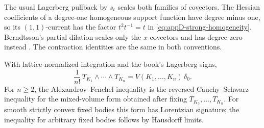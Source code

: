 \begin{remark}
\label{rem:appD-dilation-convention}
The usual Lagerberg pullback by \(s_t\) scales both families of
covectors.  The Hessian coefficients of a degree-one homogeneous
support function have degree minus one, so its \((1,1)\)-current has
the factor \(t^2t^{-1}=t\) in
\eqref{eq:appD-strong-homogeneity}.  Berndtsson's partial dilation
scales only the \(x\)-covectors and has degree zero instead
\cite[Section~7]{Ber26Convex}.  The contraction identities are the
same in both conventions.
\end{remark}

\begin{theorem}\label{thm:appD-support-current-mixed-volume}
With lattice-normalized integration and the book's Lagerberg signs,
\[
 \frac1{n!}\,
 T_{K_1}\wedge\cdots\wedge T_{K_n}
 =
 V(K_1,\ldots,K_n)\,\delta_0.
\tag{D.30}\label{eq:appD-current-mixed-volume}
\]
For \(n\geq2\), the Alexandrov--Fenchel inequality is the reversed
Cauchy--Schwarz inequality for the mixed-volume form obtained after fixing
\(T_{K_3},\ldots,T_{K_n}\).  For smooth strictly convex fixed bodies this
form has Lorentzian signature; the inequality for arbitrary fixed bodies
follows by Hausdorff limits.
\end{theorem}


